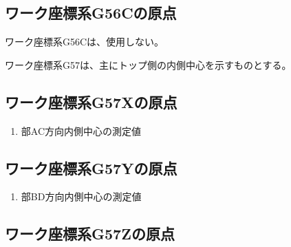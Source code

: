 \subsection{ワーク座標系{\ttfamily G56C}の原点}
ワーク座標系{\ttfamily G56C}は、使用しない。



\clearpage
ワーク座標系{\ttfamily G57}は、主にトップ側の内側中心を示すものとする。


\subsection{ワーク座標系{\ttfamily G57X}の原点}
\begin{enumerate}[label*=\sarrow]
\item \TopEndFace 部AC方向内側中心の測定値
\end{enumerate}


\subsection{ワーク座標系{\ttfamily G57Y}の原点}
\begin{enumerate}[label*=\sarrow]
\item \TopEndFace 部BD方向内側中心の測定値
\end{enumerate}


\subsection{ワーク座標系{\ttfamily G57Z}の原点\TBW}


